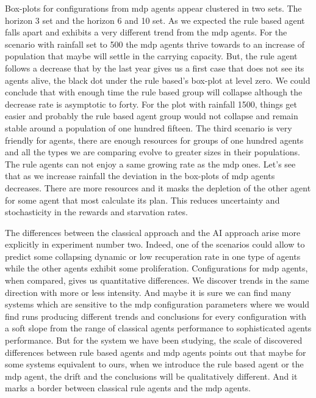 \documentclass[11pt,oneside,a4paper,openright]{report}
\begin{document}
Box-plots for configurations from mdp agents appear clustered in two sets. The horizon 3 set and the  horizon 6 and 10 set. As we expected the rule based agent falls apart and exhibits a very different trend from the mdp agents. For the scenario with rainfall set to 500 the mdp agents thrive towards to an increase of population that maybe will settle in the carrying capacity. 
But, the rule agent follows a decrease that by the last year gives us a first case that does not see its agents alive, the black dot under the rule based's box-plot at level zero. We could conclude that with enough time the rule based group will collapse although the decrease rate is asymptotic to forty. For the plot with rainfall 1500, things get easier and probably the rule based agent group would not collapse and remain stable around a population of one hundred fifteen.  
The third scenario is very friendly for agents, there are enough resources for groups of one hundred agents and all the types we are comparing evolve to greater sizes in their populations. The rule agents can not enjoy a same growing rate as the mdp ones.
Let's see that as we increase rainfall the deviation in the box-plots of mdp agents decreases. There are more resources and it masks the depletion of the other agent for some agent that most calculate its plan. This reduces uncertainty and stochasticity in the rewards and starvation rates.

The differences between the classical approach and the AI approach arise more explicitly in experiment number two. Indeed, one of the scenarios
could allow to predict some collapsing dynamic or low recuperation rate in one type of agents while the other agents exhibit some proliferation.
Configurations for mdp agents, when compared, gives us quantitative differences. We discover trends in the same direction with more or less intensity. And maybe it is sure we can find many systems which are sensitive to the mdp configuration parameters where we would find runs producing different trends and conclusions for every configuration with a soft slope from the range of classical agents performance to sophisticated agents performance. But for the system we have been studying, the scale of discovered differences between rule based agents and mdp agents points out that maybe for some systems equivalent to ours, when we introduce the rule based agent or the mdp agent, the drift and the conclusions will be qualitatively different. And it marks a border between classical rule agents and the mdp agents.
\end{document}
